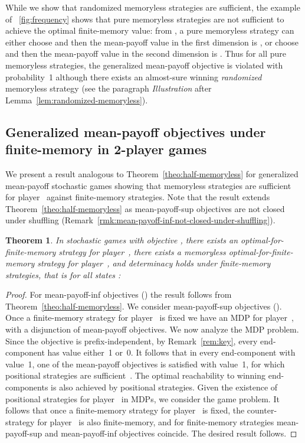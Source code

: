 \documentclass{article}
\newtheorem{theorem}{Theorem}
\newcommand{\half}{}
\begin{document}
While we show that randomized memoryless strategies are sufficient, 
the example of \figurename~\ref{fig:frequency} shows that pure memoryless
strategies are not sufficient to achieve the optimal finite-memory value:
from , a pure memoryless strategy can either choose  and then the
mean-payoff value in the first dimension is , or choose 
and then the mean-payoff value in the second dimension is . 
Thus for all pure memoryless strategies, the generalized mean-payoff objective is
violated with probability~1 although there exists an almost-sure
winning \emph{randomized} memoryless strategy (see the paragraph {\em Illustration} 
after Lemma~\ref{lem:randomized-memoryless}).



\subsection{Generalized mean-payoff objectives under finite-memory in 2\half-player games}

We present a result analogous to Theorem~\ref{theo:half-memoryless} 
for generalized mean-payoff stochastic games showing that memoryless strategies are sufficient
for player~ against finite-memory strategies. Note that the result extends Theorem~\ref{theo:half-memoryless}
as mean-payoff-sup objectives are not closed under shuffling 
(Remark~\ref{rmk:mean-payoff-inf-not-closed-under-shuffling}).

\begin{theorem}\label{theo:half-memoryless-mean-payoff}
In stochastic games with objective , 
there exists an optimal-for-finite-memory strategy for player~, there exists a memoryless optimal-for-finite-memory strategy
for player~, and determinacy holds under finite-memory strategies, that is for all states :


\end{theorem}

\begin{proof}
For mean-payoff-inf objectives () the result follows
from Theorem~\ref{theo:half-memoryless}.
We consider mean-payoff-sup objectives ().
Once a finite-memory strategy for player~ is fixed we have an MDP
for player~, with a disjunction of mean-payoff objectives.
We now analyze the MDP problem.
Since the objective is prefix-independent, by Remark~\ref{rem:key}, 
every end-component has value either~1 or~0. 
It follows that in every end-component with value~1, one of the mean-payoff 
objectives is satisfied with value~1, for which positional strategies are 
sufficient~\cite{FV97,Puterman}.
The optimal reachability to winning end-components is also achieved by
positional strategies. 
Given the existence of positional strategies for player~ in MDPs, we
consider the game problem.
It follows that once a finite-memory strategy for player~ is fixed, the 
counter-strategy for player~ is also finite-memory, and for finite-memory
strategies mean-payoff-sup and mean-payoff-inf objectives coincide.
The desired result follows.
\end{proof}
\end{document}
